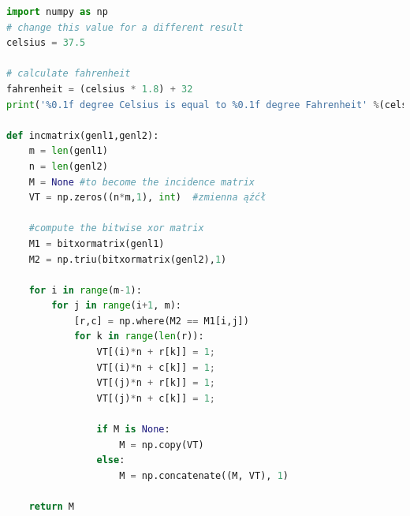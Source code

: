\begin{lstlisting}[language=Python, caption=Fragment algorytmu xxx, label=alg:kod1]
import numpy as np
# change this value for a different result
celsius = 37.5

# calculate fahrenheit
fahrenheit = (celsius * 1.8) + 32
print('%0.1f degree Celsius is equal to %0.1f degree Fahrenheit' %(celsius,fahrenheit))
 
def incmatrix(genl1,genl2):
    m = len(genl1)
    n = len(genl2)
    M = None #to become the incidence matrix
    VT = np.zeros((n*m,1), int)  #zmienna ąźćł
 
    #compute the bitwise xor matrix
    M1 = bitxormatrix(genl1)
    M2 = np.triu(bitxormatrix(genl2),1) 
 
    for i in range(m-1):
        for j in range(i+1, m):
            [r,c] = np.where(M2 == M1[i,j])
            for k in range(len(r)):
                VT[(i)*n + r[k]] = 1;
                VT[(i)*n + c[k]] = 1;
                VT[(j)*n + r[k]] = 1;
                VT[(j)*n + c[k]] = 1;
 
                if M is None:
                    M = np.copy(VT)
                else:
                    M = np.concatenate((M, VT), 1)
 
    return M
\end{lstlisting}
